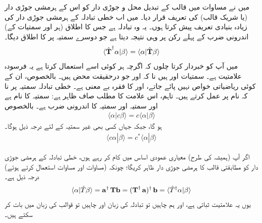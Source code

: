 میں نے مساوات  میں قالب کے تبدیل محل و جوڑی دار  کو اس کے   ہرمشی جوڑی دار  (یا شریک قالب) کی تعریف قرار دیا۔  میں اب  خطی تبادلہ کے ہرمشی جوڑی دار کی  زیادہ بنیادی تعریف پیش کرتا ہوں۔  یہ وہ تبادلہ  ہے جس کا اطلاق (ہر   اور  سمتیات کے)   اندرونی ضرب کے پہلے رکن پر وہی نتیجہ دیتا ہے جو دوسرے سمتیہ پر   کا اطلاق دیگا۔
\begin{align}
	\langle\hat{\operatorname{\mathbf{T}}}^{\dagger}\alpha|\beta\rangle = \langle\alpha|\hat{\operatorname{\mathbf{T}}}\beta\rangle
\end{align}
  میں آپ کو خبردار کرتا چلوں کہ اگرچہ ہر کوئی اسے استعمال کرتا ہے یہ فرسودہ علامتیت ہے۔ سمتیات   اور  ہیں نا کہ   اور  جو درحقیقت  محض  ہیں۔ بالخصوص،  ان کے کوئی ریاضیاتی خواص نہیں پائے جاتے،  اور   کا فقرہ بے معنی ہے۔ خطی تبادلہ  سمتیہ پر نا کہ نام پر عمل کرتے ہیں۔ تاہم،  اس علامت کا مطلب صاف ظاہر ہے: سمتیہ    کا نام     ہے اور سمتیہ  اور سمتیہ  کا اندرونی ضرب  ہے۔ بالخصوص
\begin{align}
	\langle\alpha| c\beta\rangle = c\langle\alpha|\beta\rangle
\end{align}
ہو گا، جبکہ  جہاں کسی بھی غیر سمتیہ  کے لئے درجہ ذیل ہوگا۔
\begin{align}
	\langle c\alpha|\beta\rangle = c^{*}\langle\alpha|\beta\rangle
\end{align}

اگر آپ (ہمیشہ کی طرح)  معیاری عمودی اساس میں کام کر رہے ہوں، خطی تبادلہ کے ہرمشی جوڑی دار کو مطابقتی قالب کا ہرمشی جوڑی دار ظاہر کریگا؛  چونکہ (مساوات  اور مساوات   استعمال کرتے ہوئے)  درجہ ذیل ہے۔
\begin{align}
	\langle\alpha|\hat{T}\beta\rangle = \operatorname{\mathbf{a}}^\dagger \operatorname{\mathbf{Tb}} = (\operatorname{\mathbf{T}}^\dagger \operatorname{\mathbf{a}})^\dagger \operatorname{\mathbf{b}} = \langle\hat{T}^\dagger\alpha|\beta\rangle
\end{align}
یوں یہ علامتیت ثباتی  ہے،  اور ہم چاہیں تو تبادلہ کی زبان اور چاہیں تو قوالب کی زبان میں بات کر سکتے ہیں۔

